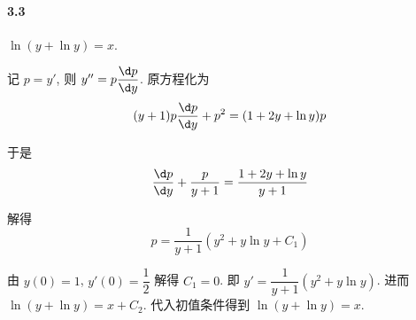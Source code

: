 \paragraph*{3.3} $\ln(y + \ln y) = x$.

记 $p=y'$, 则 $y''=p \dfrac{\d p}{\d y}$. 原方程化为
\[
	(y+1)p\dfrac{\d p}{\d y}+p^2=(1 + 2y + \ln y) p
\]

于是
\[
	\begin{aligned}
	\dfrac{\d p}{\d y} + \dfrac{p}{y + 1} = \dfrac{1 + 2y + \ln y}{y + 1}
	\end{aligned}
\]

解得
\[
	p=\dfrac{1}{y + 1}\left(y^2 + y\ln y + C_1\right)
\]

由 $y(0) = 1$, $y'(0) = \dfrac{1}{2}$ 解得 $C_1 = 0$. 即 $y' = \dfrac{1}{y+1}\left(y^2 + y\ln y\right)$. 进而 $\ln(y + \ln y) = x + C_2$. 代入初值条件得到 $\ln (y + \ln y) = x$.